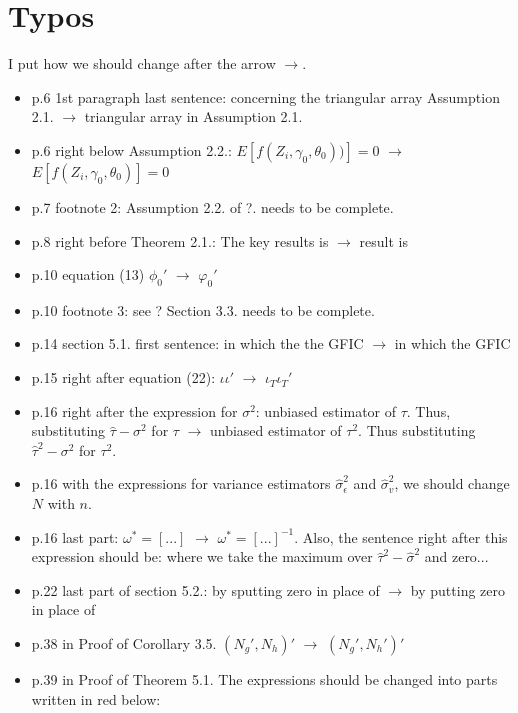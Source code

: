 \documentclass[12pt]{article}
\begin{document}
\section*{Typos}

I put how we should change after the arrow $\rightarrow$. 

\begin{itemize}
\item p.6 1st paragraph last sentence: concerning the triangular array Assumption 2.1. $\rightarrow$ triangular array in Assumption 2.1. 
\item p.6 right below Assumption 2.2.: $E[f(Z_i, \gamma_0, \theta_0))]=0$ $\rightarrow$ $E[f(Z_i, \gamma_0, \theta_0)] = 0$
\item p.7 footnote 2: Assumption 2.2. of ?. needs to be complete.
\item p.8 right before Theorem 2.1.: The key results is $\rightarrow$ result is
\item p.10 equation (13) $\phi_0'$ $\rightarrow$ $\varphi_0'$
\item p.10 footnote 3: see ? Section 3.3. needs to be complete.
\item p.14 section 5.1. first sentence: in which the the GFIC $\rightarrow$ in which the GFIC 
\item p.15 right after equation (22): $\iota\iota'$ $\rightarrow$ $\iota_T \iota_T'$
\item p.16 right after the expression for $\sigma^2$: unbiased estimator of $\tau$. Thus, substituting $\widehat{\tau}-\sigma^2$ for $\tau$ $\rightarrow$ unbiased estimator of $\tau^2$. Thus substituting $\widehat{\tau}^2-\sigma^2$ for $\tau^2$. 
\item p.16 with the expressions for variance estimators $\widehat{\sigma}_\epsilon^2$ and $\widehat{\sigma}_v^2$, we should change $N$ with $n$. 
\item p.16 last part: $\omega^{*} = [...]$ $\rightarrow$ $\omega^{*} = [...]^{-1}$. Also, the sentence right after this expression should be: where we take the maximum over $\widehat{\tau}^2 - \widehat{\sigma}^2$ and zero...
\item p.22 last part of section 5.2.: by sputting zero in place of $\rightarrow$ by putting zero in place of
\item p.38 in Proof of Corollary 3.5. $(N_g', N_h)'$ $\rightarrow$ $(N_g', N_h')'$
\item p.39 in Proof of Theorem 5.1. The expressions should be changed into parts written in red below:\\

\end{itemize}
\end{document}
